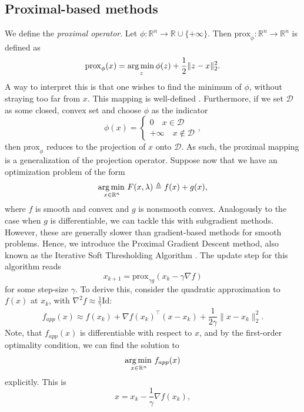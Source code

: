 \documentclass[11pt, twoside]{report}
\begin{document}
\subsection{Proximal-based methods}
We define the \textit{proximal operator}. Let $\phi : \mathbb{R}^n \xrightarrow[]{} \mathbb{R} \cup \{+
\infty\}$. Then $\mathrm{prox}_\phi: \mathbb{R}^n \xrightarrow[]{} \mathbb{R}^n$ is defined as
\begin{equation} \label{proximal}
    \mathrm{prox}_{\phi}(x) =\underset{z} {\operatorname*{arg\, min \,}} \phi(z) + \frac{1}{2}\|z-x\|_2^2.
\end{equation}
A way to interpret this is that one wishes to find the minimum of $\phi$, without straying too far from $x$\cite{proxalgs}. This mapping is well-defined \cite{fawzi2022lectures}. Furthermore, if we set $\mathcal{D}$ as some closed, convex set and choose $\phi$ as the indicator
\[\phi(x) = \begin{cases}
  0 \quad x \in \mathcal{D} \\
  +\infty \quad x \notin \mathcal{D}
\end{cases},\]
then $\mathrm{prox}_\phi$ reduces to the projection of $x$ onto $\mathcal{D}$. As such, the proximal mapping is a generalization of the projection operator. Suppose now that we have an optimization problem of the form
\begin{equation}
    \operatorname*{arg\, min \,}_{x \in \mathbb{R}^n} {F(x, \lambda) \triangleq f(x) + g(x)},
\end{equation}
where $f$ is smooth and convex and $g$ is nonsmooth convex. Analogously to the case when $g$ is differentiable, we can tackle this with subgradient methods. However, these are generally slower than gradient-based methods for smooth problems. Hence, we introduce the Proximal Gradient Descent method, also known as the Iterative Soft Thresholding Algorithm \cite{daubechies2004iterative}. The update step for this algorithm reads
\begin{equation} \label{ISTA_step}
    x_{k+1} = \mathrm{prox}_{\gamma g}(x_k - \gamma \nabla f)
\end{equation}
for some step-size $\gamma$. To derive this, consider the quadratic approximation to $f(x)$ at $x_k$, with $\nabla^2 f \approx \frac{1}{\gamma}\mathrm{Id}$:
\[f_{app}(x) \approx f(x_k) + \nabla f(x_k)^\top (x-x_k) + \frac{1}{2\gamma} \|x-x_k\|_2^2.\]
Note, that $f_{app}(x)$ is differentiable with respect to $x$, and by the first-order optimality condition, we can find the solution to 
\[\operatorname*{arg\, min \,}_{x \in \mathbb{R}^n} f_{app}(x)\]
explicitly. This is
\[x = x_k - \frac{1}{\gamma} \nabla f(x_k),\]
\end{document}
